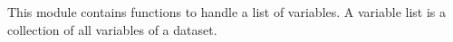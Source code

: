 This module contains functions to handle a list of variables.
A variable list is a collection of all variables of a dataset.
